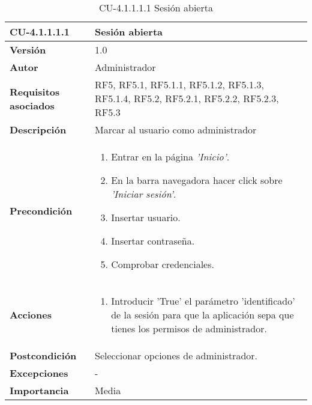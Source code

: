 \begin{table}[h!]
	\centering
	\begin{tabularx}{\linewidth}{ p{} p{} }
		\toprule
		\textbf{CU-4.1.1.1.1}    & \textbf{Sesión abierta}\\
		\toprule
		\textbf{Versión}              & 1.0    \\
		\textbf{Autor}                & Administrador \\
		\textbf{Requisitos asociados} & RF5, RF5.1, RF5.1.1, RF5.1.2, RF5.1.3, RF5.1.4, RF5.2, RF5.2.1, RF5.2.2, RF5.2.3, RF5.3\\
		\textbf{Descripción}          & Marcar al usuario como administrador\\
        \textbf{Precondición}         &  
  		\begin{enumerate}
			\def\labelenumi{\arabic{enumi}.}
			\tightlist
			\item Entrar en la página \textit{'Inicio'}.
			\item En la barra navegadora hacer click sobre \textit{'Iniciar sesión'}.
                \item Insertar usuario.
                \item Insertar contraseña.
                \item Comprobar credenciales.
		\end{enumerate}\\
		\textbf{Acciones}             &
		\begin{enumerate}
			\def\labelenumi{\arabic{enumi}.}
			\tightlist
			\item Introducir 'True' el parámetro 'identificado' de la sesión para que la aplicación sepa que tienes los permisos de administrador.
   			
		\end{enumerate}\\
		\textbf{Postcondición}     &  Seleccionar opciones de administrador. \\
		\textbf{Excepciones}          & - \\
		\textbf{Importancia}          & Media \\
		\bottomrule
	\end{tabularx}
	\caption{CU-4.1.1.1.1 Sesión abierta}
\end{table}

